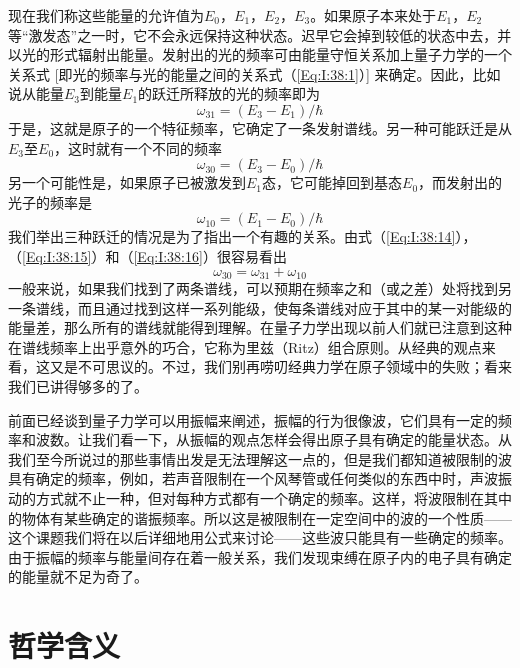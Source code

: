 现在我们称这些能量的允许值为$E_0$，$E_1$，$E_2$，$E_3$。如果原子本来处于$E_1$，$E_2$等“激发态”之一时，它不会永远保持这种状态。迟早它会掉到较低的状态中去，并以光的形式辐射出能量。发射出的光的频率可由能量守恒关系加上量子力学的一个关系式 [即光的频率与光的能量之间的关系式（\ref{Eq:I:38:1}）] 来确定。因此，比如说从能量$E_3$到能量$E_1$的跃迁所释放的光的频率即为
\begin{equation}
    \label{Eq:I:38:14}
    \omega_{31} = (E_3 - E_1)/\hbar
\end{equation}
于是，这就是原子的一个特征频率，它确定了一条发射谱线。另一种可能跃迁是从$E_3$至$E_0$，这时就有一个不同的频率
\begin{equation}
    \label{Eq:I:38:15}
    \omega_{30} = (E_3 - E_0)/\hbar
\end{equation}
另一个可能性是，如果原子已被激发到$E_1$态，它可能掉回到基态$E_0$，而发射出的光子的频率是
\begin{equation}
    \label{Eq:I:38:16}
    \omega_{10} = (E_1 - E_0)/\hbar
\end{equation}
我们举出三种跃迁的情况是为了指出一个有趣的关系。由式（\ref{Eq:I:38:14}），（\ref{Eq:I:38:15}）和（\ref{Eq:I:38:16}）很容易看出
\begin{equation}
    \label{Eq:I:38:17}
    \omega_{30} = \omega_{31} + \omega_{10}
\end{equation}
一般来说，如果我们找到了两条谱线，可以预期在频率之和（或之差）处将找到另一条谱线，而且通过找到这样一系列能级，使每条谱线对应于其中的某一对能级的能量差，那么所有的谱线就能得到理解。在量子力学出现以前人们就已注意到这种在谱线频率上出乎意外的巧合，它称为里兹（Ritz）组合原则。从经典的观点来看，这又是不可思议的。不过，我们别再唠叨经典力学在原子领域中的失败；看来我们已讲得够多的了。

前面已经谈到量子力学可以用振幅来阐述，振幅的行为很像波，它们具有一定的频率和波数。让我们看一下，从振幅的观点怎样会得出原子具有确定的能量状态。从我们至今所说过的那些事情出发是无法理解这一点的，但是我们都知道被限制的波具有确定的频率，例如，若声音限制在一个风琴管或任何类似的东西中时，声波振动的方式就不止一种，但对每种方式都有一个确定的频率。这样，将波限制在其中的物体有某些确定的谐振频率。所以这是被限制在一定空间中的波的一个性质——这个课题我们将在以后详细地用公式来讨论——这些波只能具有一些确定的频率。由于振幅的频率与能量间存在着一般关系，我们发现束缚在原子内的电子具有确定的能量就不足为奇了。

\section{哲学含义}

